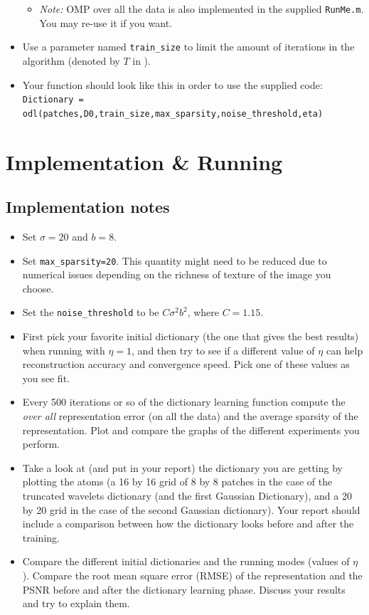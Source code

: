 \documentclass[]{article}
\begin{document}
\begin{itemize}
\begin{itemize}
\begin{enumerate}
				\end{enumerate} 
				\item \emph{Note:} OMP over all the data is also implemented in the supplied \lstinline|RunMe.m|. You may re-use it if you want.   
			\end{itemize}
			\item Use a parameter named \lstinline|train_size| to limit the amount of iterations in the algorithm (denoted by $T$ in \cite{mairal2009online}). 
			
			\item Your function should look like this in order to use the supplied code: 
			\lstinline|Dictionary = odl(patches,D0,train_size,max_sparsity,noise_threshold,eta)|
			
		\end{itemize} 
		
		\section{Implementation \& Running}
		\subsection{Implementation notes}
		\begin{itemize}
			\item Set $\sigma =20$ and $b=8$. 
			\item Set \lstinline|max_sparsity=20|. This quantity might need to be reduced due to numerical issues  depending on the richness of texture of the image you choose.  
			\item Set the \lstinline|noise_threshold| to be $C\sigma^2 b^2$, where $C=1.15$.  
			\item First pick your favorite initial dictionary (the one that gives the best results) when running with $\eta =1$, and then try to see if a different value of $\eta$ can help reconstruction accuracy and convergence speed. Pick one of these values as you see fit. 
			
			\item Every 500 iterations or so of the dictionary learning function compute the \emph{over all} representation error (on all the data) and the average sparsity of the representation. Plot and compare the graphs of the different experiments you  perform.
			\item Take a look at (and put in your report) the dictionary you are getting by plotting the atoms (a 16 by 16 grid of 8 by 8 patches in the case of the truncated wavelets dictionary (and the first Gaussian Dictionary), and a 20 by 20 grid in the case of the second Gaussian dictionary). Your report should include a comparison between how the dictionary looks before and after the training.  
			\item Compare the different initial dictionaries and the running modes (values of $\eta$). Compare the root mean square error (RMSE) of the representation and the PSNR before and after the dictionary learning phase. Discuss your results and try to explain them.  
		\end{itemize}
		
\end{document}
